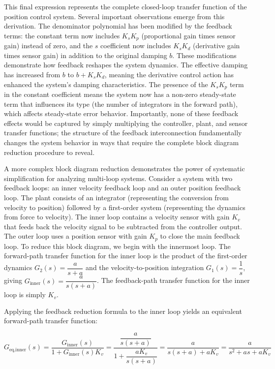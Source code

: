 This final expression represents the complete closed-loop transfer function of the position control system. Several important observations emerge from this derivation. The denominator polynomial has been modified by the feedback terms: the constant term now includes $K_s K_p$ (proportional gain times sensor gain) instead of zero, and the $s$ coefficient now includes $K_s K_d$ (derivative gain times sensor gain) in addition to the original damping $b$. These modifications demonstrate how feedback reshapes the system dynamics. The effective damping has increased from $b$ to $b + K_s K_d$, meaning the derivative control action has enhanced the system's damping characteristics. The presence of the $K_s K_p$ term in the constant coefficient means the system now has a non-zero steady-state term that influences its type (the number of integrators in the forward path), which affects steady-state error behavior. Importantly, none of these feedback effects would be captured by simply multiplying the controller, plant, and sensor transfer functions; the structure of the feedback interconnection fundamentally changes the system behavior in ways that require the complete block diagram reduction procedure to reveal.

A more complex block diagram reduction demonstrates the power of systematic simplification for analyzing multi-loop systems. Consider a system with two feedback loops: an inner velocity feedback loop and an outer position feedback loop. The plant consists of an integrator (representing the conversion from velocity to position) followed by a first-order system (representing the dynamics from force to velocity). The inner loop contains a velocity sensor with gain $K_v$ that feeds back the velocity signal to be subtracted from the controller output. The outer loop uses a position sensor with gain $K_p$ to close the main feedback loop. To reduce this block diagram, we begin with the innermost loop. The forward-path transfer function for the inner loop is the product of the first-order dynamics $G_2(s) = \dfrac{a}{s + a}$ and the velocity-to-position integration $G_1(s) = \dfrac{1}{s}$, giving $G_{\text{inner}}(s) = \dfrac{a}{s(s + a)}$. The feedback-path transfer function for the inner loop is simply $K_v$.

Applying the feedback reduction formula to the inner loop yields an equivalent forward-path transfer function:

\begin{equation}
G_{\text{eq,inner}}(s) = \frac{G_{\text{inner}}(s)}{1 + G_{\text{inner}}(s)K_v} = \frac{\dfrac{a}{s(s + a)}}{1 + \dfrac{a K_v}{s(s + a)}} = \frac{a}{s(s + a) + a K_v} = \frac{a}{s^2 + a s + a K_v}
\end{equation}

